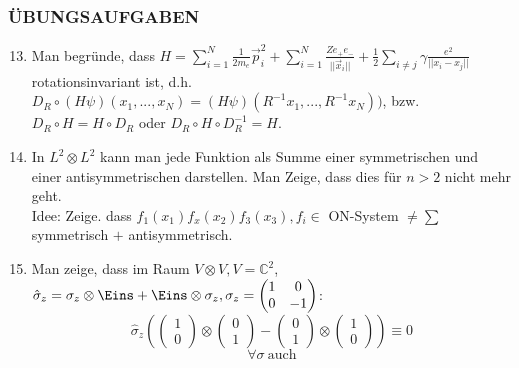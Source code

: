 \documentclass[twoside,a4paper]{scrartcl}
\newcommand{\C}{\mathbb{C}}
\renewcommand{\1}{\mathds{1}}
\renewcommand{\C}{\mathbb{C}}
\begin{document}
\subsubsection*{ÜBUNGSAUFGABEN}
\begin{enumerate}
\setcounter{enumi}{12}
\item Man begründe, dass $H=\sum_{i=1}^N\frac{1}{2m_e} \vec p_i^2+\sum_{i=1}^N \frac{Ze_+e_-}{||\vec x_i||}+\frac{1}{2}\sum_{i\neq j} \gamma \frac{e^2}{||x_i-x_j||}$ rotationsinvariant ist, d.h. $D_R \circ(H\psi)(x_1,...,x_N)=(H\psi)(R^{-1}x_1,...,R^{-1}x_N))$, bzw. $D_R \circ H=H \circ D_R$ oder $D_R \circ H \circ D_R^{-1}=H$.
\item In $L^2 \otimes L^2$ kann man jede Funktion als Summe einer symmetrischen und einer antisymmetrischen darstellen. Man Zeige, dass dies für $n>2$ nicht mehr geht.\\
Idee: Zeige. dass $f_1(x_1)f_x(x_2)f_3(x_3), f_i \in$ ON-System $\neq \sum$ symmetrisch $+$ antisymmetrisch.
\item Man zeige, dass im Raum $V\otimes V, V=\C^2$, $\hat \sigma_z=\sigma_z\otimes \Eins+ \Eins \otimes \sigma_z, \sigma_z= \begin{pmatrix} 1 & 0 \\ 0 & -1 \end{pmatrix}$:
$$\hat \sigma_z (\begin{pmatrix} 1 \\0 \end{pmatrix}\otimes \begin{pmatrix} 0 \\1 \end{pmatrix}- \begin{pmatrix} 0 \\1 \end{pmatrix}\otimes \begin{pmatrix} 1 \\0 \end{pmatrix})\equiv 0$$
$$\forall \sigma \ \mathrm{auch}$$
\end{enumerate}
\end{document}
